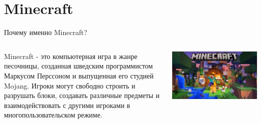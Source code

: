 \documentclass[handout]{beamer}
\begin{document}
    \section{Minecraft}
    \begin{frame}{Почему именно Minecraft?}
        \begin{columns}
            \begin{column}{0.5\textwidth}
                Minecraft - это компьютерная игра в жанре песочницы, созданная шведским программистом Маркусом Перссоном и выпущенная его студией Mojang. Игроки могут свободно строить и разрушать блоки, создавать различные предметы и взаимодействовать с другими игроками в многопользовательском режиме.
            \end{column}
            \begin{column}{0.5\textwidth}
                \includegraphics[width=\textwidth]{img/minecraft.jpg}
            \end{column}
        \end{columns}
    \end{frame}
\end{document}
